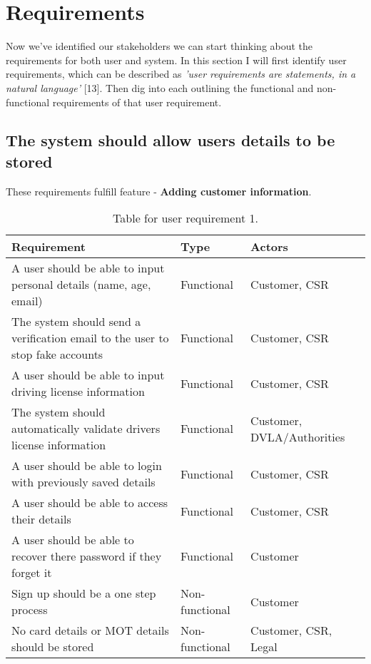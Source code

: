 \section{Requirements}
  Now we've identified our stakeholders we can start thinking about the requirements for both user and system. In this section I will first identify user
  requirements, which can be described as \textit{'user requirements are statements, in a natural language'} [13].
  Then dig into each outlining the functional and non-functional requirements of that user requirement.

  \subsection{The system should allow users details to be stored}
  These requirements fulfill feature - \textbf{Adding customer information}.
    \begin{table}[H]
      \centering
      \begin{tabular}{|p{}|p{}|p{}|}
        \hline
        Requirement & Type & Actors \\ \hline
        A user should be able to input personal details (name, age, email) & Functional & Customer, CSR \\ \hline
        The system should send a verification email to the user to stop fake accounts & Functional & Customer, CSR \\ \hline
        A user should be able to input driving license information & Functional & Customer, CSR \\ \hline
        The system should automatically validate drivers license information & Functional & Customer, DVLA/Authorities \\ \hline
        A user should be able to login with previously saved details & Functional & Customer, CSR \\ \hline
        A user should be able to access their details & Functional & Customer, CSR \\ \hline
        A user should be able to recover there password if they forget it & Functional  & Customer \\ \hline
        Sign up should be a one step process & Non-functional & Customer \\ \hline
        No card details or MOT details should be stored & Non-functional & Customer, CSR, Legal \\ \hline
      \end{tabular}
      \caption{Table for user requirement 1.}
    \end{table}

